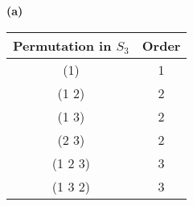 \begin{enumerate}
      \textbf{(a)}
      \begin{center}
         \begin{tabular}{@{}|c|c|@{}}   \hline
            Permutation in $S_3$    & Order   \\ \hline
            (1)      & 1       \\ \hline
            (1 2)    & 2       \\ \hline 
            (1 3)    & 2       \\ \hline
            (2 3)    & 2       \\ \hline
            (1 2 3)  & 3       \\ \hline
            (1 3 2)  & 3       \\ \hline
         \end{tabular}
      \end{center}


\end{enumerate}
